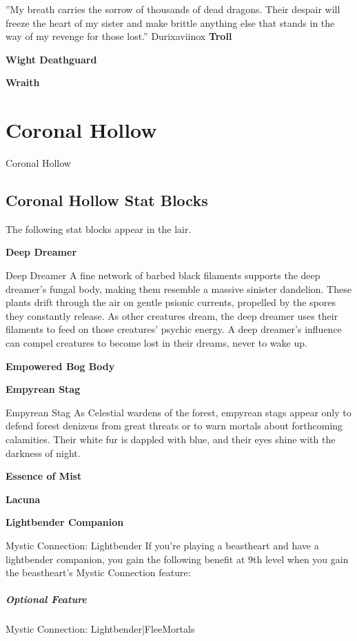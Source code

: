 \documentclass[10pt,a4paper,twoside,bg=print,twocolumn,openany,nodeprecatedcode]{dndbook}
\begin{document}
\DndQuote%
{}
{''My breath carries the sorrow of thousands of dead dragons. Their despair will freeze the heart of my sister and make brittle anything else that stands in the way of my revenge for those lost.''}
{Durixaviinox}
\textbf{Troll}

\textbf{Wight Deathguard}

\textbf{Wraith}

\chapter{Coronal Hollow}
Coronal Hollow

\section{Coronal Hollow Stat Blocks}
The following stat blocks appear in the lair.

\textbf{Deep Dreamer}

\begin{DndSidebar}[float=!b]{Deep Dreamer}
A fine network of barbed black filaments supports the deep dreamer's fungal body, making them resemble a massive sinister dandelion. These plants drift through the air on gentle psionic currents, propelled by the spores they constantly release. As other creatures dream, the deep dreamer uses their filaments to feed on those creatures' psychic energy. A deep dreamer's influence can compel creatures to become lost in their dreams, never to wake up.



\end{DndSidebar}

\textbf{Empowered Bog Body}

\textbf{Empyrean Stag}

\begin{DndSidebar}[float=!b]{Empyrean Stag}
As Celestial wardens of the forest, empyrean stags appear only to defend forest denizens from great threats or to warn mortals about forthcoming calamities. Their white fur is dappled with blue, and their eyes shine with the darkness of night.



\end{DndSidebar}

\textbf{Essence of Mist}

\textbf{Lacuna}

\textbf{Lightbender Companion}

\begin{DndSidebar}[float=!b]{Mystic Connection: Lightbender}
If you're playing a beastheart and have a lightbender companion, you gain the following benefit at 9th level when you gain the beastheart's Mystic Connection feature:



\paragraph{Optional Feature}
Mystic Connection: Lightbender|FleeMortals



\end{DndSidebar}
\end{document}
